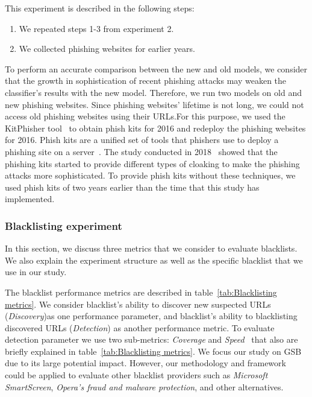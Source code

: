 \documentclass[letterpaper,twocolumn,10pt]{article}
\begin{document}

This experiment is described in the following steps:
\begin{enumerate}
    \item We repeated steps 1-3 from experiment 2.
    \item We collected phishing websites for earlier years.
\end{enumerate}

To perform an accurate comparison between the new and old models, we consider that the growth in sophistication of recent phishing attacks may weaken the classifier's results with the new model. Therefore, we run two models on old and new phishing websites.
Since phishing websites' lifetime is not long, we could not access old phishing websites using their URLs.For this purpose, we used the KitPhisher tool~\cite{cybercdh} to obtain phish kits for 2016 and redeploy the phishing websites for 2016.
Phish kits are a unified set of tools that phishers use to deploy a phishing site on a server~\cite{mccalley2011analysis}. The study conducted in 2018~\cite{oest2018inside} showed that the phishing kits started to provide different types of cloaking to make the phishing attacks more sophisticated. To provide phish kits without these techniques, we used phish kits of two years earlier than the time that this study has implemented.


\subsubsection{Blacklisting experiment}
In this section, we discuss three metrics that we consider to evaluate blacklists. We also explain the experiment structure as well as the specific blacklist that we use in our study. 

The blacklist performance metrics are described in table~\ref{tab:Blacklisting metrics}. We consider blacklist's ability to discover new suspected URLs
(\textit{Discovery})as one performance parameter, and blacklist's ability to blacklisting discovered URLs (\textit{Detection})  as another performance metric. To evaluate detection parameter we use two sub-metrics: \textit{Coverage} and \textit{Speed}~\cite{oest2020phishtime} that also are briefly explained in table~\ref{tab:Blacklisting metrics}. 
We focus our study on GSB due to its large potential impact. However, our methodology and framework could be applied to evaluate other blacklist providers such as \textit{Microsoft SmartScreen}, \textit{Opera’s fraud and malware protection}, and other alternatives.
\end{document}
